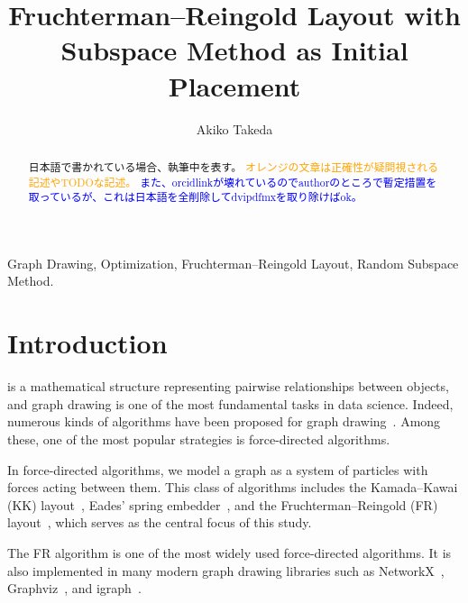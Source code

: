 \documentclass[dvipdfmx,lettersize,journal]{IEEEtran}
\newcommand{\blue}[1]{\textcolor{blue}{#1}}
\newcommand{\orange}[1]{\textcolor{orange}{#1}}
\begin{document}

\title{Fruchterman--Reingold Layout with\\Subspace Method as Initial Placement}
\author{
  Akiko Takeda
}
\maketitle

\begin{abstract}
  日本語で書かれている場合、執筆中を表す。
  \orange{オレンジの文章は正確性が疑問視される記述やTODOな記述。}
  \blue{また、orcidlinkが壊れているのでauthorのところで暫定措置を取っているが、これは日本語を全削除してdvipdfmxを取り除けばok。}
  \lipsum[1]
\end{abstract}

\begin{IEEEkeywords}
  Graph Drawing, Optimization, Fruchterman--Reingold Layout, Random Subspace Method.
\end{IEEEkeywords}

\section{Introduction}\label{sec:introduction}

 is a mathematical structure representing pairwise relationships between objects, and graph drawing is one of the most fundamental tasks in data science. Indeed, numerous kinds of algorithms have been proposed for graph drawing~\cite{tutteHowDrawGraph1963,chrobakLineartimeAlgorithmDrawing1995,sugiyamaMethodsVisualUnderstanding1981,ghassemitoosiSimulatedAnnealingPreProcessing2016}.
Among these, one of the most popular strategies is force-directed algorithms.

In force-directed algorithms, we model a graph as a system of particles with forces acting between them.
This class of algorithms includes the Kamada--Kawai (KK) layout~\cite{kamadaAlgorithmDrawingGeneral1989},
Eades' spring embedder~\cite{eades1984heuristic}, and the Fruchterman--Reingold (FR) layout~\cite{fruchtermanGraphDrawingForcedirected1991,kobourovSpringEmbeddersForce2012}, which serves as the central focus of this study.

The FR algorithm is one of the most widely used force-directed algorithms. It is also implemented in many modern graph drawing libraries such as NetworkX~\cite{osti_960616}, Graphviz~\cite{ellsonGraphvizOpenSource2002}, and igraph~\cite{csardiIgraphSoftwarePackage2006}.
\end{document}
